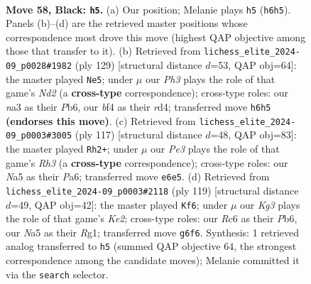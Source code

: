 \documentclass[11pt]{article}
\begin{document}
\clearpage

\begin{figure}[p]\centering
\begin{subfigure}{0.46\textwidth}\centering
\resizebox{\linewidth}{!}{%
\newchessgame
\chessboard[
  setfen={7r/p7/1pr1p1kp/n7/2PKPB2/N5P1/P6R/1R6 b - - 0 58},
  showmover=false,
  pgfstyle=straightmove, color=movearrow, markmove={h6-h5}
]}
\caption{}
\end{subfigure}\hfill
\begin{subfigure}{0.46\textwidth}\centering
\resizebox{\linewidth}{!}{%
\newchessgame
\chessboard[
  setfen={8/p2nr2k/1pr3p1/6Rp/3RPN1P/P3K3/6P1/8 b - - 19 65},
  showmover=false,
  pgfstyle=straightmove, color=movearrow, markmove={d7-e5}
]}
\caption{}
\end{subfigure}
\\[4pt]
\begin{subfigure}{0.46\textwidth}\centering
\resizebox{\linewidth}{!}{%
\newchessgame
\chessboard[
  setfen={4n3/2r2kp1/p1p4r/Pp4R1/1P1PB3/2R2P2/5K2/8 b - - 0 59},
  showmover=false,
  pgfstyle=straightmove, color=movearrow, markmove={h6-h2}
]}
\caption{}
\end{subfigure}\hfill
\begin{subfigure}{0.46\textwidth}\centering
\resizebox{\linewidth}{!}{%
\newchessgame
\chessboard[
  setfen={8/4k3/1pr1p2N/p1p1R2P/P1B5/1P3K2/5P2/6r1 b - - 0 60},
  showmover=false,
  pgfstyle=straightmove, color=movearrow, markmove={e7-f6}
]}
\caption{}
\end{subfigure}
\caption{\textbf{Move 58, Black: \texttt{h5}.} (a) Our position; Melanie plays \texttt{h5} (\texttt{h6h5}). Panels (b)--(d) are the retrieved master positions whose correspondence most drove this move (highest QAP objective among those that transfer to it). (b) Retrieved from \texttt{lichess\_elite\_2024-09\_p0028\#1982} (ply 129) [structural distance $d$=53, QAP obj=64]: the master played \texttt{Ne5}; under $\mu$ our \emph{Ph3} plays the role of that game's \emph{Nd2} (a \textbf{cross-type} correspondence); cross-type roles: our \emph{n}a3 as their \emph{P}b6, our \emph{b}f4 as their \emph{r}d4; transferred move \texttt{h6h5} \textbf{(endorses this move)}. (c) Retrieved from \texttt{lichess\_elite\_2024-09\_p0003\#3005} (ply 117) [structural distance $d$=48, QAP obj=83]: the master played \texttt{Rh2+}; under $\mu$ our \emph{Pe3} plays the role of that game's \emph{Rh3} (a \textbf{cross-type} correspondence); cross-type roles: our \emph{N}a5 as their \emph{P}a6; transferred move \texttt{e6e5}. (d) Retrieved from \texttt{lichess\_elite\_2024-09\_p0003\#2118} (ply 119) [structural distance $d$=49, QAP obj=42]: the master played \texttt{Kf6}; under $\mu$ our \emph{Kg3} plays the role of that game's \emph{Ke2}; cross-type roles: our \emph{R}c6 as their \emph{P}b6, our \emph{N}a5 as their \emph{R}g1; transferred move \texttt{g6f6}. Synthesis: 1 retrieved analog transferred to \texttt{h5} (summed QAP objective 64, the strongest correspondence among the candidate moves); Melanie committed it via the \texttt{search} selector.}
\label{fig:thought-m115}
\end{figure}
\end{document}
